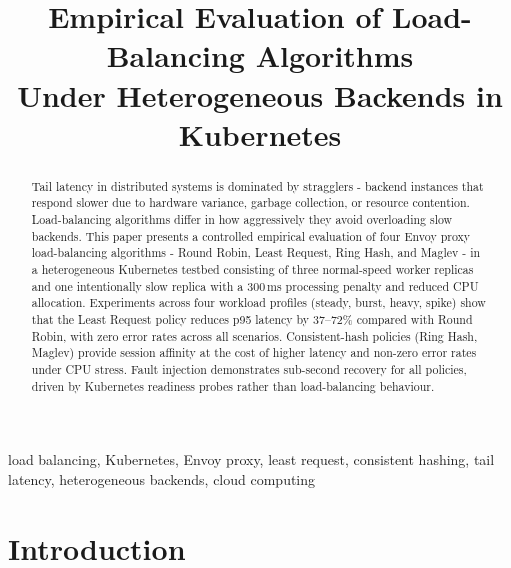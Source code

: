 \documentclass[conference]{IEEEtran}
\begin{document}
\title{Empirical Evaluation of Load-Balancing Algorithms\\
  Under Heterogeneous Backends in Kubernetes}

\author{
}


\maketitle

\begin{abstract}
  Tail latency in distributed systems is dominated by stragglers - backend instances
  that respond slower due to hardware variance, garbage collection, or resource
  contention. Load-balancing algorithms differ in how aggressively they avoid
  overloading slow backends.
  This paper presents a controlled empirical evaluation of four Envoy proxy
  load-balancing algorithms - Round Robin, Least Request, Ring Hash, and Maglev - in
  a heterogeneous Kubernetes testbed consisting of three normal-speed worker
  replicas and one intentionally slow replica with a 300\,ms processing penalty
  and reduced CPU allocation.
  Experiments across four workload profiles (steady, burst, heavy, spike) show
  that the Least Request policy reduces p95 latency by 37--72\% compared with Round
  Robin, with zero error rates across all scenarios.
  Consistent-hash policies (Ring Hash, Maglev) provide session affinity at the
  cost of higher latency and non-zero error rates under CPU stress.
  Fault injection demonstrates sub-second recovery for all policies, driven by
  Kubernetes readiness probes rather than load-balancing behaviour.
\end{abstract}

\begin{IEEEkeywords}
  load balancing, Kubernetes, Envoy proxy, least request, consistent hashing,
  tail latency, heterogeneous backends, cloud computing
\end{IEEEkeywords}

\section{Introduction}
\end{document}

